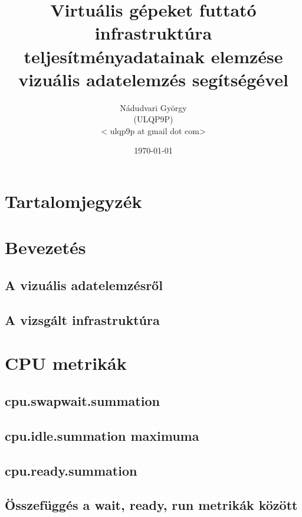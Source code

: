 \documentclass[a4paper,10pt,titlepage]{article}
\newcommand{\szerzo}{Nádudvari György}
\newcommand{\szerzoneptun}{ULQP9P}
\newcommand{\szerzomail}{ulqp9p at gmail dot com}
\newcommand{\cim}{Virtuális gépeket futtató infrastruktúra teljesítményadatainak elemzése vizuális adatelemzés segítségével}
\begin{document}

\begin{titlepage}
    \title{\cim}
    \author{\szerzo \\ (\szerzoneptun) \\ < \szerzomail >}
    \date{\today}
\end{titlepage}
\maketitle

\section*{Tartalomjegyzék}
\makeatletter
{}
\makeatother

\section{Bevezetés}
\subsection{A vizuális adatelemzésről}
\subsection{A vizsgált infrastruktúra}

\section{CPU metrikák}
\subsection{cpu.swapwait.summation}
\subsection{cpu.idle.summation maximuma}
\subsection{cpu.ready.summation}
\subsection{Összefüggés a wait, ready, run metrikák között}
\end{document}
